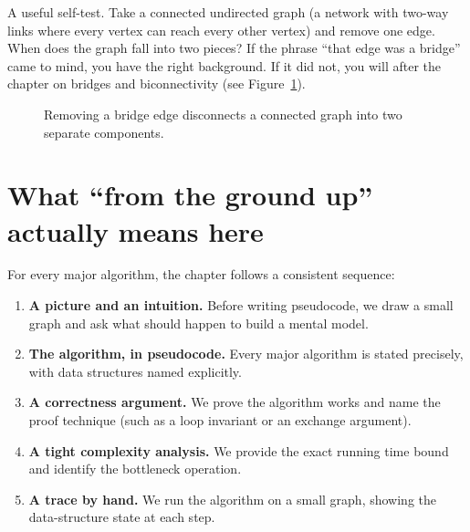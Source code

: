 \begin{intuitionbox}
A useful self-test. Take a connected undirected graph (a network with two-way links where every vertex can reach every other vertex) and remove one edge. When does the graph fall into two pieces? If the phrase ``that edge was a bridge'' came to mind, you have the right background. If it did not, you will after the chapter on bridges and biconnectivity (see Figure~\ref{fig:bridge_example}).
\end{intuitionbox}

\begin{figure}[htbp]
\centering
{}
\caption{Removing a bridge edge disconnects a connected graph into two separate components.}
\label{fig:bridge_example}
\end{figure}

\section*{What ``from the ground up'' actually means here}

For every major algorithm, the chapter follows a consistent sequence:

\begin{enumerate}
  \item \textbf{A picture and an intuition.} Before writing pseudocode, we draw a small graph and ask what should happen to build a mental model.
  \item \textbf{The algorithm, in pseudocode.} Every major algorithm is stated precisely, with data structures named explicitly.
  \item \textbf{A correctness argument.} We prove the algorithm works and name the proof technique (such as a loop invariant or an exchange argument).
  \item \textbf{A tight complexity analysis.} We provide the exact running time bound and identify the bottleneck operation.
  \item \textbf{A trace by hand.} We run the algorithm on a small graph, showing the data-structure state at each step.
\end{enumerate}

